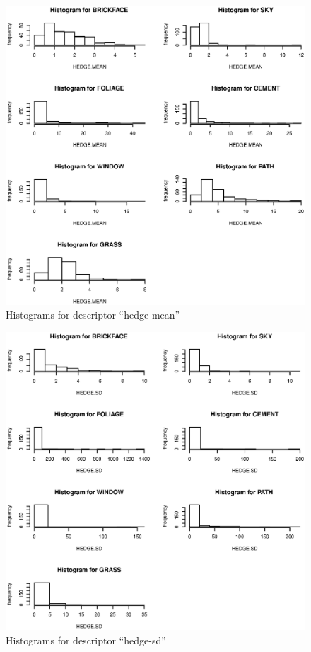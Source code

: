 \documentclass{article}
\begin{document}
\begin{figure}[htp]
\centering
\includegraphics[width=12cm]{a8.eps}
\caption{Histograms for descriptor ``hedge-mean''}
\end{figure}

\begin{figure}[htp]
\centering
\includegraphics[width=12cm]{a9.eps}
\caption{Histograms for descriptor ``hedge-sd''}
\end{figure}
\end{document}
